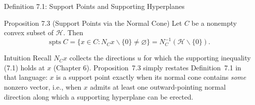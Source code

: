\documentclass[aspectratio=169,10pt]{beamer}
\DeclareMathOperator{\spts}{spts}
\newcommand{\Hil}{\mathcal{H}}
\begin{document}
\begin{frame}[allowframebreaks]{Definition 7.1: Support Points and Supporting Hyperplanes}
  \begin{block}{Proposition 7.3 (Support Points via the Normal Cone)}
    Let $C$ be a nonempty convex subset of $\Hil$. Then
    \[
      \spts C = \{x \in C : N_C x \smallsetminus \{0\} \ne \varnothing\}
        = N_C^{-1}(\Hil \smallsetminus \{0\}). \tag{7.2}
    \]
  \end{block}

  \begin{block}{Intuition}
    Recall $N_Cx$ collects the directions $u$ for which the supporting
    inequality (7.1) holds at $x$ (Chapter 6). Proposition~7.3 simply
    restates Definition~7.1 in that language: $x$ is a support point exactly
    when its normal cone contains \emph{some} nonzero vector, i.e., when $x$
    admits at least one outward-pointing normal direction along which a
    supporting hyperplane can be erected.
  \end{block}

\end{frame}
\end{document}
